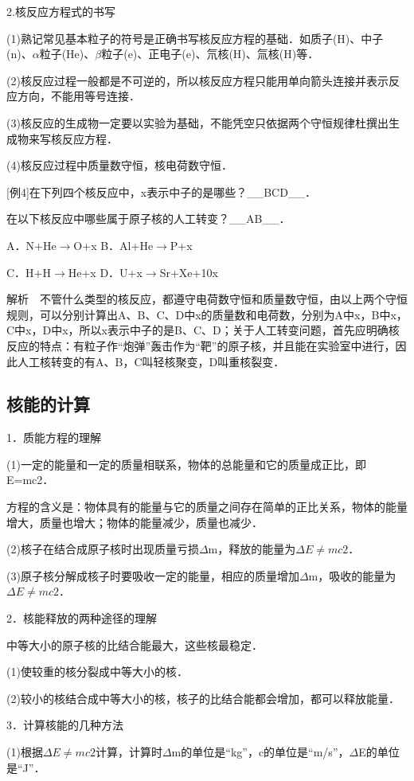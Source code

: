 2.核反应方程式的书写

(1)熟记常见基本粒子的符号是正确书写核反应方程的基础．如质子(H)、中子(n)、$\alpha$粒子(He)、$\beta$粒子(e)、正电子(e)、氘核(H)、氚核(H)等．

(2)核反应过程一般都是不可逆的，所以核反应方程只能用单向箭头连接并表示反应方向，不能用等号连接．

(3)核反应的生成物一定要以实验为基础，不能凭空只依据两个守恒规律杜撰出生成物来写核反应方程．

(4)核反应过程中质量数守恒，核电荷数守恒．

{[}例4{]}在下列四个核反应中，x表示中子的是哪些？\_\_BCD\_\_．

在以下核反应中哪些属于原子核的人工转变？\_\_AB\_\_．

A．N+He$\rightarrow$O+x B．Al+He$\rightarrow$P+x

C．H+H$\rightarrow$He+x D．U+x$\rightarrow$Sr+Xe+10x

解析　不管什么类型的核反应，都遵守电荷数守恒和质量数守恒，由以上两个守恒规则，可以分别计算出A、B、C、D中x的质量数和电荷数，分别为A中x，B中x，C中x，D中x，所以x表示中子的是B、C、D；关于人工转变问题，首先应明确核反应的特点：有粒子作``炮弹''轰击作为``靶''的原子核，并且能在实验室中进行，因此人工核转变的有A、B，C叫轻核聚变，D叫重核裂变．
\newpage
\subsection{核能的计算}

1．质能方程的理解

(1)一定的能量和一定的质量相联系，物体的总能量和它的质量成正比，即E=mc2．

方程的含义是：物体具有的能量与它的质量之间存在简单的正比关系，物体的能量增大，质量也增大；物体的能量减少，质量也减少．

(2)核子在结合成原子核时出现质量亏损$\Delta$m，释放的能量为$\Delta E\neq mc2$．

(3)原子核分解成核子时要吸收一定的能量，相应的质量增加$\Delta$m，吸收的能量为$\Delta E\neq mc2$．

2．核能释放的两种途径的理解

中等大小的原子核的比结合能最大，这些核最稳定．

(1)使较重的核分裂成中等大小的核．

(2)较小的核结合成中等大小的核，核子的比结合能都会增加，都可以释放能量．

3．计算核能的几种方法

(1)根据$\Delta E\neq mc2$计算，计算时$\Delta$m的单位是``kg''，c的单位是``m/s''，$\Delta$E的单位是``J''．


